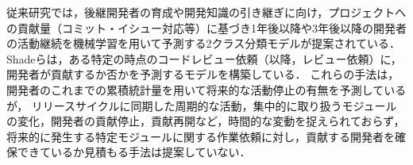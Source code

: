\documentclass[submit,noauthor,ses,dvipdfmx]{ipsj}
\newcommand{\todo}[1]{\colorbox{yellow}{{\bf TODO}:}{\color{red} {\textbf{[#1]}}}}
\newcommand{\memo}[1]{\colorbox{red}{{\bf memo}:}{\color{blue} {\textbf{[#1]}}}}
\begin{document}
従来研究では，後継開発者の育成や開発知識の引き継ぎに向け，プロジェクトへの貢献量（コミット・イシュー対応等）に基づき1年後以降や3年後以降の開発者の活動継続を機械学習を用いて予測する2クラス分類モデルが提案されている\cite{zhou}\cite{bao}\cite{constantinou}．Shadeらは，ある特定の時点のコードレビュー依頼（以降，レビュー依頼）に，開発者が貢献するか否かを予測するモデルを構築している\cite{shade}．
これらの手法は，開発者のこれまでの累積統計量を用いて将来的な活動停止の有無を予測しているが，
リリースサイクルに同期した周期的な活動，集中的に取り扱うモジュールの変化，開発者の貢献停止，貢献再開など，時間的な変動を捉えられておらず，将来的に発生する特定モジュールに関する作業依頼に対し，貢献する開発者を確保できているか見積もる手法は提案していない．



\end{document}
